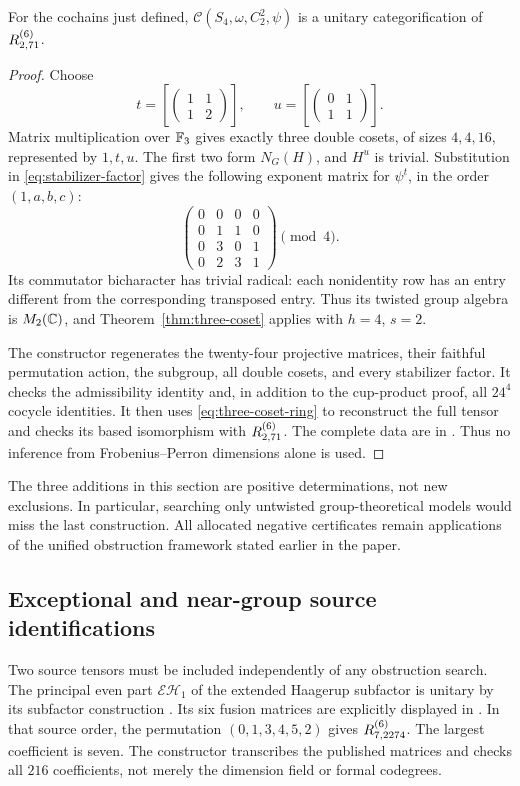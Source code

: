 \begin{theorem}\label{thm:s4-model}
For the cochains just defined,
$\mathcal C(S_4,\omega,C_2^2,\psi)$ is a unitary categorification of
$R^{(6)}_{2,71}$.
\end{theorem}
\begin{proof}
Choose
\[
 t=\left[\begin{pmatrix}1&1\\1&2\end{pmatrix}\right],\qquad
 u=\left[\begin{pmatrix}0&1\\1&1\end{pmatrix}\right].
\]
Matrix multiplication over $\mathbb F_3$ gives exactly three double cosets,
of sizes $4,4,16$, represented by $1,t,u$. The first two form
$N_G(H)$, and $H^u$ is trivial. Substitution in
\eqref{eq:stabilizer-factor} gives the following exponent matrix for
$\psi^t$, in the order $(1,a,b,c)$:
\[
 \begin{pmatrix}
 0&0&0&0\\0&1&1&0\\0&3&0&1\\0&2&3&1
 \end{pmatrix}\pmod4.
\]
Its commutator bicharacter has trivial radical: each nonidentity row
has an entry different from the corresponding transposed entry.
Thus its twisted group algebra is $M_2(\mathbb C)$, and
Theorem~\ref{thm:three-coset} applies with $h=4$, $s=2$.

The constructor regenerates the twenty-four projective matrices, their
faithful permutation action, the subgroup, all double cosets, and every
stabilizer factor. It checks the admissibility identity and, in addition
to the cup-product proof, all $24^4$ cocycle identities. It then uses
\eqref{eq:three-coset-ring} to reconstruct the full tensor and checks its
based isomorphism with $R^{(6)}_{2,71}$. The complete data are in
. Thus no inference from
Frobenius--Perron dimensions alone is used.
\end{proof}

The three additions in this section are positive determinations, not
new exclusions. In particular, searching only untwisted group-theoretical
models would miss the last construction. All allocated negative
certificates remain applications of the unified obstruction framework
stated earlier in the paper.



\subsection{Exceptional and near-group source identifications}\label{sec:source-audit}
Two source tensors must be included independently of any obstruction search.
The principal even part $\mathcal{EH}_1$ of the extended Haagerup subfactor
is unitary by its subfactor construction \cite{BMPS}. Its six fusion matrices
are explicitly displayed in \cite[Section~5.1]{BPEH}. In that source order,
the permutation $(0,1,3,4,5,2)$ gives $R^{(6)}_{7,2274}$. The largest coefficient
is seven. The constructor transcribes the published matrices and checks
all $216$ coefficients, not merely the dimension field or formal codegrees.


